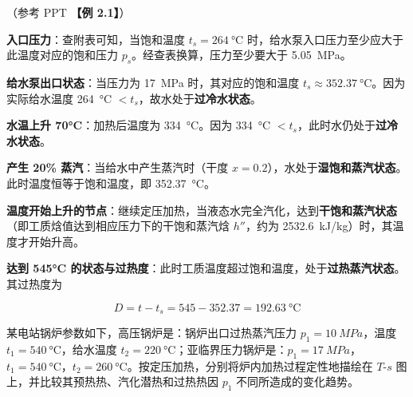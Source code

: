 \begin{solution}
（参考 PPT \textbf{【例 2.1】}）

\textbf{入口压力}：查附表可知，当饱和温度 \(t_s = \qty{264}{\degreeCelsius}\) 时，给水泵入口压力至少应大于此温度对应的饱和压力 \(p_s\)。经查表换算，压力至少要大于 \qty{5.05}{MPa}。

\textbf{给水泵出口状态}：当压力为 \qty{17}{MPa} 时，其对应的饱和温度 \(t_s \approx \qty{352.37}{\degreeCelsius}\)。因为实际给水温度 \qty{264}{\degreeCelsius} \(< t_s\)，故水处于\textbf{过冷水状态}。

\textbf{水温上升 70°C}：加热后温度为 \qty{334}{\degreeCelsius}。因为 \qty{334}{\degreeCelsius} \(< t_s\)，此时水仍处于\textbf{过冷水状态}。

\textbf{产生 20\% 蒸汽}：当给水中产生蒸汽时（干度 \(x = 0.2\)），水处于\textbf{湿饱和蒸汽状态}。此时温度恒等于饱和温度，即 \qty{352.37}{\degreeCelsius}。

\textbf{温度开始上升的节点}：继续定压加热，当液态水完全汽化，达到\textbf{干饱和蒸汽状态}（即工质焓值达到相应压力下的干饱和蒸汽焓 \(h''\)，约为 \qty{2532.6}{kJ/kg}）时，其温度才开始升高。

\textbf{达到 545°C 的状态与过热度}：此时工质温度超过饱和温度，处于\textbf{过热蒸汽状态}。其过热度为

\begin{equation*}
  D = t - t_s = 545 - 352.37 = \qty{192.63}{\degreeCelsius}
\end{equation*}
\end{solution}

\begin{problem}
某电站锅炉参数如下，高压锅炉是：锅炉出口过热蒸汽压力 \(p_1 = \qty{10}{MPa}\)，温度 \(t_1 = \qty{540}{\degreeCelsius}\)，给水温度 \(t_2 = \qty{220}{\degreeCelsius}\)；亚临界压力锅炉是：\(p_1 = \qty{17}{MPa}\)，\(t_1 = \qty{540}{\degreeCelsius}\)，\(t_2 = \qty{260}{\degreeCelsius}\)。按定压加热，分别将炉内加热过程定性地描绘在 \(T\)-\(s\) 图上，并比较其预热热、汽化潜热和过热热因 \(p_1\) 不同所造成的变化趋势。
\end{problem}

